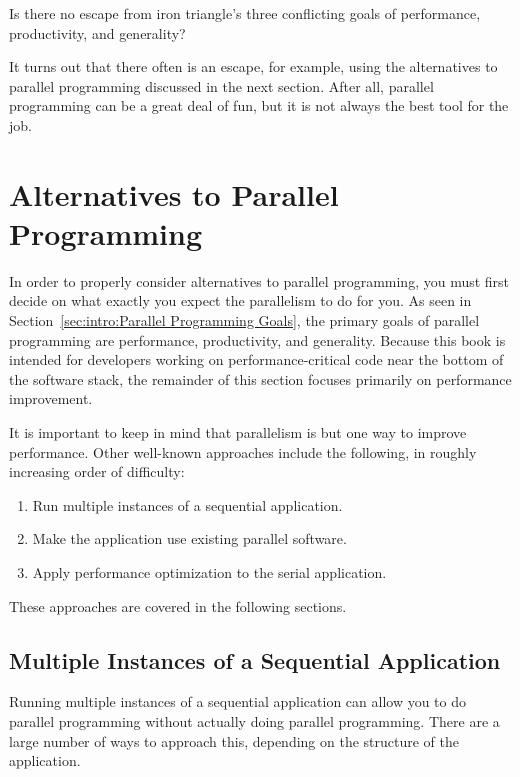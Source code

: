 Is there no escape from iron triangle's three conflicting goals of
performance, productivity, and generality?

It turns out that there often is an escape, for example,
using the alternatives to parallel programming discussed in the next section.
After all, parallel programming can be a great deal of fun, but
it is not always the best tool for the job.

\section{Alternatives to Parallel Programming}
\label{sec:intro:Alternatives to Parallel Programming}

In order to properly consider alternatives to parallel programming,
you must first decide on what exactly you expect the parallelism
to do for you.
As seen in Section~\ref{sec:intro:Parallel Programming Goals},
the primary goals of parallel programming are performance, productivity,
and generality.
Because this book is intended for developers working on
performance-critical code near the bottom of the software stack,
the remainder of this section focuses primarily on performance improvement.

It is important to keep in mind that parallelism is but one way to
improve performance.
Other well-known approaches include the following, in roughly increasing
order of difficulty:

\begin{enumerate}
\item	Run multiple instances of a sequential application.
\item	Make the application use existing parallel software.
\item	Apply performance optimization to the serial application.
\end{enumerate}

These approaches are covered in the following sections.

\subsection{Multiple Instances of a Sequential Application}
\label{sec:intro:Multiple Instances of a Sequential Application}

Running multiple instances of a sequential application can allow you
to do parallel programming without actually doing parallel programming.
There are a large number of ways to approach this, depending on the
structure of the application.

